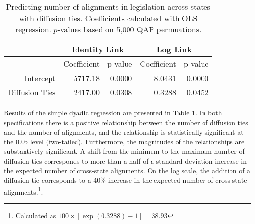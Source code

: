 \documentclass[12pt]{article} %
\begin{document}
\begin{table}[ht]
\centering
\begin{tabular}{rrrrr}
\hline
& \multicolumn{2}{c}{Identity Link} & \multicolumn{2}{c}{Log Link} \\
  \hline
 & Coefficient & p-value & Coefficient & p-value \\ 
  \hline
Intercept & 5717.18 & 0.0000 & 8.0431 & 0.0000 \\ 
  Diffusion Ties & 2417.00 & 0.0308 & 0.3288 & 0.0452 \\ 
   \hline
\end{tabular}
\caption{Predicting number of alignments in legislation across states with diffusion ties. Coefficients calculated with OLS regression. $p$-values based on 5,000 QAP permuations.}
\label{tab:qap.diffusion}
\end{table}

Results of the simple dyadic regression are presented in Table \ref{tab:qap.diffusion}. In both specifications there is a positive relationship between the number of diffusion ties and the number of alignments, and the relationship is statistically significant at the 0.05 level (two-tailed). Furthermore, the magnitudes of the relationships are substantively significant. A shift from the minimum to the maximum number of diffusion ties corresponds to more than a half of a standard deviation increase in the expected number of cross-state alignments. On the log scale, the addition of a diffusion tie corresponds to a 40\% increase in the expected number of cross-state alignments.\footnote{Calculated as $100\times \left[ \exp(0.3288)-1\right] = 38.93$}. 
\end{document}
